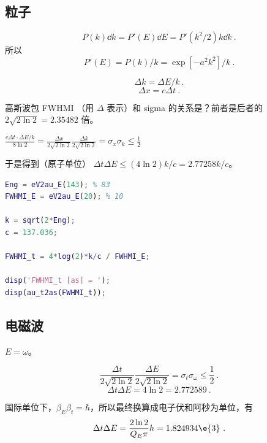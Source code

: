 
\subsection{粒子}
\begin{equation}
P(k)\dd{k} = P'(E)\dd{E} = P'(k^2/2)k\dd{k}~.
\end{equation}
所以
\begin{equation}
P'(E) = P(k)/k = \exp[-a^2 k^2]/k~.
\end{equation}

\begin{equation}
\Delta k = \Delta E/k~.
\end{equation}
\begin{equation}
\Delta x = c\Delta t~.
\end{equation}


高斯波包 FWHMI （用 $\Delta$ 表示）和 sigma 的关系是？前者是后者的 $2\sqrt{2\ln 2} = 2.35482$ 倍。

$\frac{c\Delta t \cdot \Delta E/k}{8\ln 2} = \frac{\Delta x}{2\sqrt{2\ln 2}}\frac{\Delta k}{2\sqrt{2\ln 2}} = \sigma_x \sigma_k \leq \frac{1}{2}$

于是得到（原子单位） $\Delta t\Delta E \leq (4\ln 2)k/c = 2.77258 k/c$。

\begin{lstlisting}[language=matlab]
Eng = eV2au_E(143); % 83
FWHMI_E = eV2au_E(20); % 10

k = sqrt(2*Eng);
c = 137.036;

FWHMI_t = 4*log(2)*k/c / FWHMI_E;

disp('FWHMI_t [as] = ');
disp(au_t2as(FWHMI_t));
\end{lstlisting}

\subsection{电磁波}
$E = \omega$。

\begin{equation}
\frac{\Delta t}{2\sqrt{2\ln 2}}\frac{\Delta E}{2\sqrt{2\ln 2}} = \sigma_t \sigma_\omega \leq \frac{1}{2}~.
\end{equation}
\begin{equation}
\Delta t\Delta E = 4\ln 2 = 2.772589~.
\end{equation}

国际单位下，$\beta_E\beta_t = \hbar$，所以最终换算成电子伏和阿秒为单位，有
\begin{equation}
\Delta t \Delta E  = \frac{2\ln 2}{Q_E\pi}h = 1.824934\e{3}~.
\end{equation}
